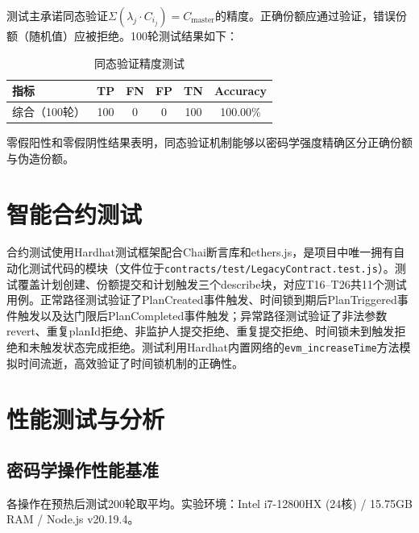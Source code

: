 \documentclass[UTF8,a4paper,zihao=-4,openany]{ctexrep}
\begin{document}
测试主承诺同态验证$\Sigma(\lambda_j \cdot C_{i_j}) = C_{\text{master}}$的精度。正确份额应通过验证，错误份额（随机值）应被拒绝。100轮测试结果如下：

\begin{table}[H]
\centering
\caption{同态验证精度测试}
\label{tab:verify}
\begin{tabularx}{\textwidth}{lccccc}
\toprule
指标 & TP & FN & FP & TN & Accuracy\\
\midrule
综合（100轮） & 100 & 0 & 0 & 100 & 100.00\%\\
\bottomrule
\end{tabularx}
\end{table}

零假阳性和零假阴性结果表明，同态验证机制能够以密码学强度精确区分正确份额与伪造份额。

\section{智能合约测试}

合约测试使用Hardhat测试框架配合Chai断言库和ethers.js，是项目中唯一拥有自动化测试代码的模块（文件位于\texttt{contracts/test/LegacyContract.test.js}）。测试覆盖计划创建、份额提交和计划触发三个describe块，对应T16--T26共11个测试用例。正常路径测试验证了PlanCreated事件触发、时间锁到期后PlanTriggered事件触发以及达门限后PlanCompleted事件触发；异常路径测试验证了非法参数revert、重复planId拒绝、非监护人提交拒绝、重复提交拒绝、时间锁未到触发拒绝和未触发状态完成拒绝。测试利用Hardhat内置网络的\texttt{evm\_increaseTime}方法模拟时间流逝，高效验证了时间锁机制的正确性。

\section{性能测试与分析}
\label{sec:performance}

\subsection{密码学操作性能基准}

各操作在预热后测试200轮取平均。实验环境：Intel i7-12800HX (24核) / 15.75GB RAM / Node.js v20.19.4。
\end{document}
